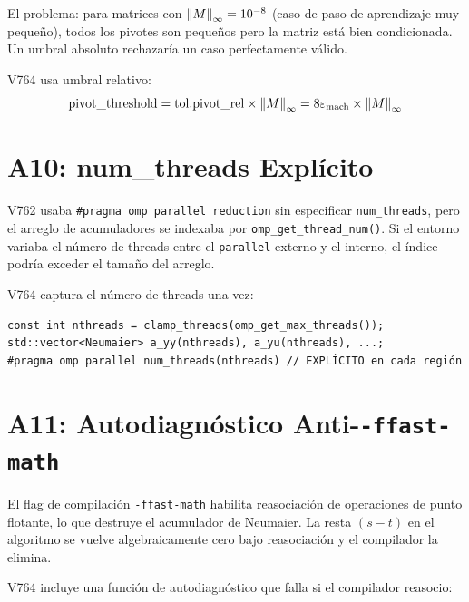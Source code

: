 El problema: para matrices con $\norm{M}_\infty = 10^{-8}$ (caso de paso de aprendizaje muy pequeño),
todos los pivotes son pequeños pero la matriz está bien condicionada. Un umbral absoluto
rechazaría un caso perfectamente válido.

V764 usa umbral relativo:
\begin{equation}
\text{pivot\_threshold} = \text{tol.pivot\_rel} \times \norm{M}_\infty = 8\varepsilon_{\text{mach}} \times \norm{M}_\infty
\end{equation}

\section{A10: num\_threads Explícito}

V762 usaba \texttt{\#pragma omp parallel reduction} sin especificar \texttt{num\_threads},
pero el arreglo de acumuladores se indexaba por \texttt{omp\_get\_thread\_num()}. Si el entorno
variaba el número de threads entre el \texttt{parallel} externo y el interno, el índice podría
exceder el tamaño del arreglo.

V764 captura el número de threads una vez:
\begin{lstlisting}[style=cppstyle, caption={num\_threads explícito --- A10}, label=lst:numthreads]
const int nthreads = clamp_threads(omp_get_max_threads());
std::vector<Neumaier> a_yy(nthreads), a_yu(nthreads), ...;
#pragma omp parallel num_threads(nthreads) // EXPLÍCITO en cada región
\end{lstlisting}

\section{A11: Autodiagnóstico Anti-\texttt{-ffast-math}}

El flag de compilación \texttt{-ffast-math} habilita reasociación de operaciones de punto
flotante, lo que destruye el acumulador de Neumaier. La resta $(s - t)$ en el algoritmo
se vuelve algebraicamente cero bajo reasociación y el compilador la elimina.

V764 incluye una función de autodiagnóstico que falla si el compilador reasocio:

